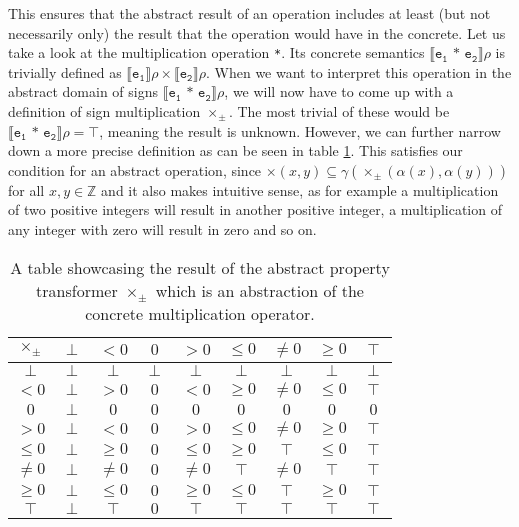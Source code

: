 

\noindent This ensures that the abstract result of an operation includes at least (but not necessarily only) the result that the operation would have in the concrete. Let us take a look at the multiplication operation \texttt{*}. Its concrete semantics $\llbracket\mathtt{e_1\texttt{ * } e_2}\rrbracket\rho$ is trivially defined as $\llbracket\mathtt{e_1}\rrbracket\rho \times\llbracket\mathtt{e_2}\rrbracket\rho$. When we want to interpret this operation in the abstract domain of signs $\llbracket\mathtt{e_1\texttt{ * } e_2}\rrbracket\rho$, we will now have to come up with a definition of sign multiplication $\times_\pm$. The most trivial of these would be $\llbracket\mathtt{e_1\texttt{ * } e_2}\rrbracket\rho=\top$, meaning the result is unknown. However, we can further narrow down a more precise definition as can be seen in table \ref{table:multiply}. This satisfies our condition for an abstract operation, since $\times(x,y)\subseteq\gamma(\times_\pm(\alpha(x),\alpha(y)))$ for all $x,y\in\mathbb{Z}$ and it also makes intuitive sense, as for example a multiplication of two positive integers will result in another positive integer, a multiplication of any integer with zero will result in zero and so on.


\begin{table}[hbt]
\begin{center}
\begin{tabular}{c|c|c|c|c|c|c|c|c}
            $\times_\pm$& $\perp$ & $<0$    & $0$     & $>0$    & $\leq0$ & $\neq0$ & $\geq0$ & $\top$  \\ \hline
            $\perp$ & $\perp$ & $\perp$ & $\perp$ & $\perp$ & $\perp$ & $\perp$ & $\perp$ & $\perp$ \\
            $<0$    & $\perp$ & $>0$    & $0$     & $<0$    & $\geq0$ & $\neq0$ & $\leq0$ & $\top$  \\
            $0$     & $\perp$ & $0$     & $0$     & $0$     & $0$     & $0$     & $0$     & $0$     \\
            $>0$    & $\perp$ & $<0$    & $0$     & $>0$    & $\leq0$ & $\neq0$ & $\geq0$ & $\top$  \\
            $\leq0$ & $\perp$ & $\geq0$ & $0$     & $\leq0$ & $\geq0$ & $\top$  & $\leq0$ & $\top$  \\
            $\neq0$ & $\perp$ & $\neq0$ & $0$     & $\neq0$ & $\top$  & $\neq0$ & $\top$  & $\top$  \\
            $\geq0$ & $\perp$ & $\leq0$ & $0$     & $\geq0$ & $\leq0$ & $\top$  & $\geq0$ & $\top$  \\
            $\top$  & $\perp$ & $\top$  & $0$     & $\top$  & $\top$  & $\top$  & $\top$  & $\top$ 
        \end{tabular}
  \caption{A table showcasing the result of the abstract property transformer $\times_\pm$ which is an abstraction of the concrete multiplication operator.}\label{table:multiply}
  \end{center}
\end{table}

